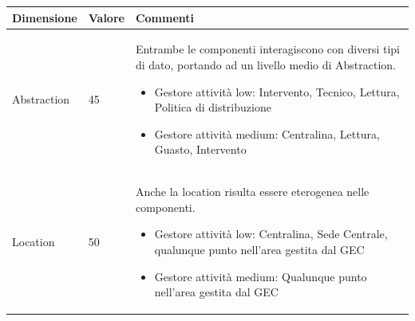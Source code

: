 \documentclass{beamer}
\begin{document}
\begin{frame}[allowframebreaks]
\begin{center}
\begin{table}
{					\begin{tabular}{|M{0.1\textwidth}|M{0.1\textwidth}|p{.6\textwidth}|}
						\hline
						Dimensione & Valore & Commenti \\
						\hline
						Abstraction & 45 & Entrambe le componenti interagiscono con diversi tipi di dato, portando ad un livello medio di Abstraction.
						\begin{itemize}
							\item Gestore attività low: Intervento, Tecnico, Lettura, Politica di distribuzione
							\item Gestore attività medium: Centralina, Lettura, Guasto, Intervento
						\end{itemize} \\
						Location & 50 & Anche la location risulta essere eterogenea nelle componenti. 
						\begin{itemize}
							\item Gestore attività low: Centralina, Sede Centrale, qualunque punto nell'area gestita dal GEC
							\item Gestore attività medium: Qualunque punto nell'area gestita dal GEC
						\end{itemize} \\
						\hline
				\end{tabular}}
			\end{table}
		\end{center}	
	\end{frame}
	
\end{document}
